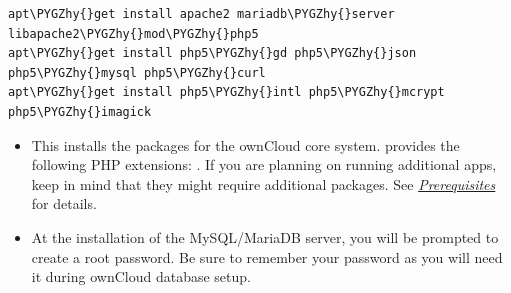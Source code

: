 \documentclass[letterpaper,10pt,english]{sphinxmanual}
\def\PYGZhy{\char`\-}
\begin{document}
\begin{Verbatim}[commandchars=\\\{\}]
apt\PYGZhy{}get install apache2 mariadb\PYGZhy{}server libapache2\PYGZhy{}mod\PYGZhy{}php5
apt\PYGZhy{}get install php5\PYGZhy{}gd php5\PYGZhy{}json php5\PYGZhy{}mysql php5\PYGZhy{}curl
apt\PYGZhy{}get install php5\PYGZhy{}intl php5\PYGZhy{}mcrypt php5\PYGZhy{}imagick
\end{Verbatim}
\begin{itemize}
\item {} 
This installs the packages for the ownCloud core system.
 provides the following PHP extensions: . If you are planning
on running additional apps, keep in mind that they might require additional
packages.  See {\hyperref[installation/source_installation:prerequisites\string-label]{\emph{Prerequisites}}} for details.

\item {} 
At the installation of the MySQL/MariaDB server, you will be prompted to
create a root password. Be sure to remember your password as you will need it
during ownCloud database setup.

\end{itemize}
\end{document}
